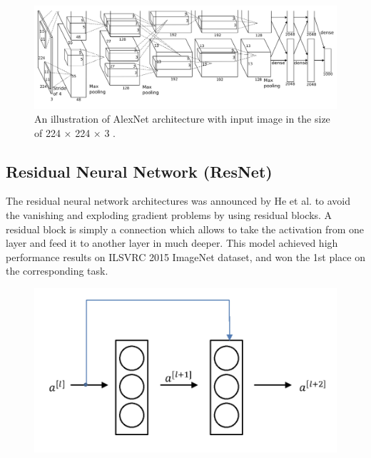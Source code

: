 \begin{figure}[h]
    \centering
    \includegraphics[width=\linewidth]{fig/alexnet_arch.png}
    \caption{An illustration of AlexNet architecture with input image in the size of 224 × 224 × 3 \cite{AlexNet}.}
    \label{fig:alexnet_arch}
\end{figure}

\subsection{Residual Neural Network (ResNet)}

The residual neural network architectures was announced by He et al. \cite{ResNet} to avoid the vanishing and exploding gradient problems by using residual blocks. A residual block is simply a connection which allows to take the activation from one layer and feed it to another layer in much deeper. This model achieved high performance results on ILSVRC 2015 ImageNet \cite{imagenet} dataset, and won the 1st place on the corresponding task.

\begin{figure}[h]
    \centering
    \includegraphics[width=.6\linewidth]{fig/residual_block.png}
    \label{fig:residual_block}
\end{figure}

